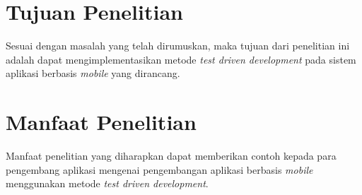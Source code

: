 \begin{spacing}{2}
\section{Tujuan Penelitian}
Sesuai dengan masalah yang telah dirumuskan, maka tujuan dari penelitian ini adalah dapat mengimplementasikan metode \emph{test driven development} pada sistem aplikasi berbasis \emph{mobile} yang dirancang.

\section{Manfaat Penelitian}
Manfaat penelitian yang diharapkan dapat memberikan contoh kepada para pengembang aplikasi mengenai pengembangan aplikasi berbasis \emph{mobile} menggunakan metode \emph{test driven development}.

\end{spacing}
\begin{comment}

\end{comment}
